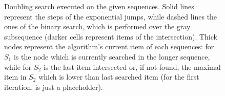\begin{enumerate}
\begin{figure}[t]
\begin{subfigure}{\linewidth}
      \caption{}
    \end{subfigure}

    \caption{Doubling search executed on the given sequences. Solid lines
    represent the steps of the exponential jumps, while dashed lines the ones of
    the binary search, which is performed over the gray subsequence (darker cells
    represent items of the intersection). Thick nodes represent the algorithm's
    current item of each sequences: for $S_1$ is the node which is currently
    searched in the longer sequence, while for $S_2$ is the last item intersected
    or, if not found, the maximal item in $S_2$ which is lower than last searched
    item (for the first iteration, is just a placeholder).}

    \label{fig:doubling-intersection}
  \end{figure}

\end{enumerate}
